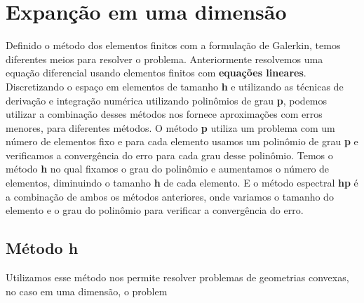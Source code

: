 \chapter{Expanção em uma dimensão}
 Definido o método dos elementos finitos com a formulação de Galerkin, temos diferentes meios para resolver o problema. Anteriormente resolvemos uma equação diferencial usando elementos finitos com \textbf{equações lineares}. Discretizando o espaço em elementos de tamanho \textbf{h} e utilizando as técnicas de derivação e integração numérica utilizando polinômios de grau \textbf{p}, podemos utilizar a combinação desses métodos nos fornece aproximações com erros menores, para diferentes métodos.
 O método \textbf{p} utiliza um problema com um número de elementos fixo e para cada elemento usamos um  polinômio de grau \textbf{p} e verificamos a convergência do erro para cada grau desse polinômio. Temos o método \textbf{h} no qual fixamos o grau do polinômio e aumentamos o número de elementos, diminuindo o tamanho \textbf{h} de cada elemento.
 E o método espectral \textbf{hp} é a combinação de ambos os métodos anteriores, onde variamos o tamanho do elemento e o grau do polinômio para verificar a convergência do erro. 
 \section{Método h}
 Utilizamos esse método nos permite resolver problemas de geometrias convexas, no caso em uma dimensão, o problem